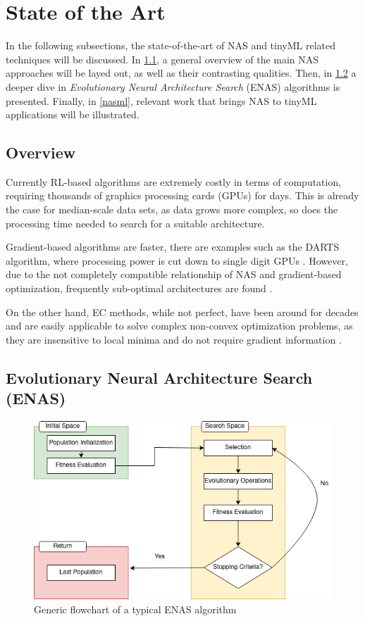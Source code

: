 \documentclass[10pt,        %
               a4paper,     %
               journal,     %
               ]{IEEEtran}
\begin{document}
\section{State of the Art}
\label{SOA}

In the following subsections, the state-of-the-art of NAS and tinyML related techniques will be discussed. In
\ref{OV}, a general overview of the main NAS approaches will be layed out, as well as their contrasting qualities.
Then, in \ref{EV} a deeper dive in \textit{Evolutionary Neural Architecture Search} (ENAS) algorithms is presented. Finally, in
\ref{nasml}, relevant work that brings NAS to tinyML applications will be illustrated.

\subsection{Overview}
\label{OV}
Currently RL-based algorithms are extremely costly in terms of computation, requiring thousands of
graphics processing cards (GPUs) for days. This is already the case for median-scale data sets, as
data grows more complex, so does the processing time needed to search for a suitable architecture.

Gradient-based algorithms are faster, there are examples such as the DARTS algorithm, where processing power
is cut down to single digit GPUs \cite{liu2018darts}. However, due to the not completely compatible relationship
of NAS and gradient-based optimization, frequently sub-optimal architectures are found \cite{liu2021survey}.

On the other hand, EC methods, while not perfect, have been around for decades and are easily applicable
to solve complex non-convex optimization problems, as they are insensitive to local minima and do not require
gradient information \cite{liu2021survey}.

\subsection{Evolutionary Neural Architecture Search (ENAS)}
\label{EV}

\begin{figure}[!h]
    \centering
    \includegraphics[scale=0.4]{evol}
    \caption{Generic flowchart of a typical ENAS algorithm}
    \label{evol}
\end{figure}
\end{document}
